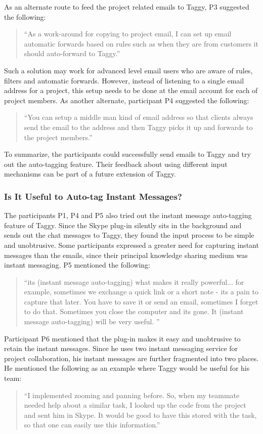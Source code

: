 As an alternate route to feed the project related emails to Taggy, P3 suggested the following:
\begin{quote}
	``As a work-around for copying to project email, I can set up email automatic forwards based on rules such as when they are from customers it should auto-forward to Taggy.'' 
\end{quote}
Such a solution may work for advanced level email users who are aware of rules, filters and automatic forwards. However, instead of listening to a single email address for a project, this setup needs to be done at the email account for each of project members. As another alternate, participant P4 suggested the following:
\begin{quote}
	``You can setup a middle man kind of email address so that clients always send the email to the address and then Taggy picks it up and forwards to the project members.''
\end{quote}
To summarize, the participants could successfully send emails to Taggy and try out the auto-tagging feature. Their feedback about using different input mechanisms can be part of a future extension of Taggy.

\subsubsection{Is It Useful to Auto-tag Instant Messages?}
The participants P1, P4 and P5 also tried out the instant message auto-tagging feature of Taggy. Since the Skype plug-in silently sits in the background and sends out the chat messages to Taggy, they found the input process to be simple and unobtrusive. Some participants expressed a greater need for capturing instant messages than the emails, since their principal knowledge sharing medium was instant messaging. P5 mentioned the following:

\begin{quote}
	``its (instant message auto-tagging) what makes it really powerful... for example, sometimes we exchange a quick link or a short note - its a pain to capture that later. You have to save it or send an email, sometimes I forget to do that. Sometimes you close the computer and its gone. It (instant message auto-tagging) will be very useful. ''
\end{quote}

Participant P6 mentioned that the plug-in makes it easy and unobtrusive to retain the instant messages. Since he uses two instant messaging service for project collaboration, his instant messages are further fragmented into two places. He mentioned the following as an example where Taggy would be useful for his team:
\begin{quote}
``I implemented zooming and panning before. So, when my teammate needed help about a similar task, I looked up the code from the project and sent him in Skype. It would be good to have this stored with the task, so that one can easily use this information.''
\end{quote}

